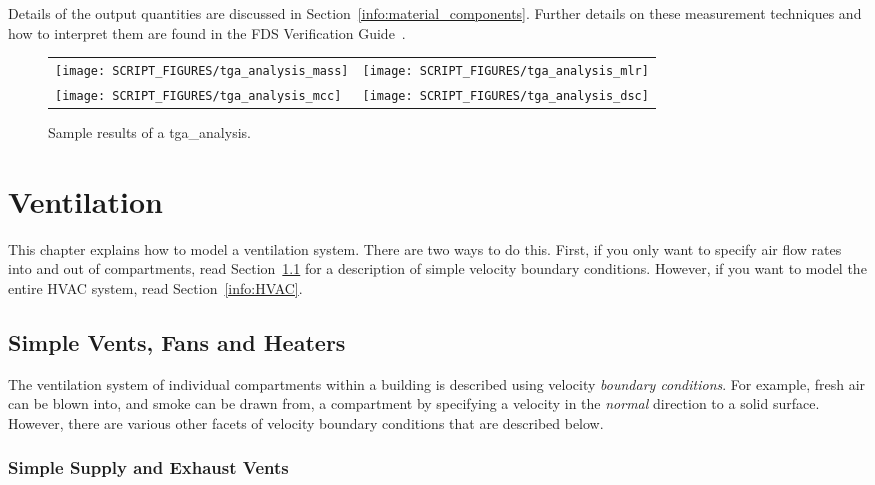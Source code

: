 \documentclass[11pt]{book}
\begin{document}
Details of the output quantities are discussed in Section~\ref{info:material_components}. Further details on these measurement techniques and how to interpret them are found in the FDS Verification Guide~\cite{FDS_Verification_Guide}.

\begin{figure}[ht]
\begin{tabular*}{\textwidth}{lr}
\texttt{[image: SCRIPT\_FIGURES/tga\_analysis\_mass]} &
\texttt{[image: SCRIPT\_FIGURES/tga\_analysis\_mlr]} \\
\texttt{[image: SCRIPT\_FIGURES/tga\_analysis\_mcc]} &
\texttt{[image: SCRIPT\_FIGURES/tga\_analysis\_dsc]}
\end{tabular*}
\caption[Sample results of a {\ct tga\_analysis}]{Sample results of a {\ct tga\_analysis}.}
\label{tga_results}
\end{figure}







\chapter{Ventilation}

This chapter explains how to model a ventilation system. There are two ways to do this. First, if you only want to specify air flow rates into and out of
compartments, read Section~\ref{info:Velocity_BC} for a description of simple velocity boundary conditions. However, if you want to
model the entire HVAC system, read Section~\ref{info:HVAC}.


\section{Simple Vents, Fans and Heaters}
\label{info:Velocity_BC}

The ventilation system of individual compartments within a building is described using velocity {\em boundary conditions}. For example, fresh air can be blown into, and smoke can be drawn from, a compartment by specifying a velocity in the {\em normal} direction to a solid surface. However, there are various other facets of velocity boundary conditions that are described below.

\subsection{Simple Supply and Exhaust Vents}
\label{volume_flow_1}
\label{volume_flow_2}
\end{document}
